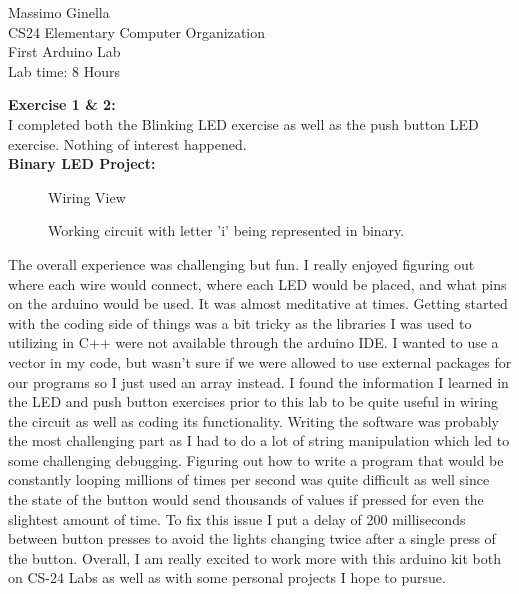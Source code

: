\documentclass[12pt]{article}
\begin{document}
	\begin{center}
		Massimo Ginella \\
		CS24 Elementary Computer Organization \\
		First Arduino Lab \\
		Lab time: 8 Hours \vspace{0.5cm} \\
	\end{center}
	
	\begin{center}
		\textbf{Exercise 1 \& 2:}  \\
		I completed both the Blinking LED exercise as well as the push button LED exercise. Nothing of interest happened. \vspace{0.5cm} \\
		
		\textbf{Binary LED Project:} \vspace{0.1cm} \\
		\setlength{\fboxrule}{8pt}
		\begin{figure}[h]
			\centering
			\caption{Wiring View} %
		\end{figure}
		
		\begin{figure}[t!]
			\centering
			\caption{Working circuit with letter 'i' being represented in binary.} %
			\label{fig:my_label} %
		\end{figure}
		
		
		
	\end{center}
	
	The overall experience was challenging but fun. I really enjoyed figuring out where each wire would connect, where each LED would be placed, and what pins on the arduino would be used. It was almost meditative at times. Getting started with the coding side of things was a bit tricky as the libraries I was used to utilizing in C++ were not available through the arduino IDE. I wanted to use a vector in my code, but wasn't sure if we were allowed to use external packages for our programs so I just used an array instead. I found the information I learned in the LED and push button exercises prior to this lab to be quite useful in wiring the circuit as well as coding its functionality. Writing the software was probably the most challenging part as I had to do a lot of string manipulation which led to some challenging debugging. Figuring out how to write a program that would be constantly looping millions of times per second was quite difficult as well since the state of the button would send thousands of values if pressed for even the slightest amount of time. To fix this issue I put a delay of 200 milliseconds between button presses to avoid the lights changing twice after a single press of the button. Overall, I am really excited to work more with this arduino kit both on CS-24 Labs as well as with some personal projects I hope to pursue.\\
	
	
	
\end{document}
